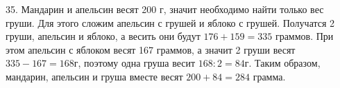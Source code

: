 35. Мандарин и апельсин весят 200 г, значит необходимо найти только вес груши. Для этого сложим апельсин с грушей и яблоко с грушей. Получатся 2 груши, апельсин и яблоко, а весить они будут $176+159=335$ граммов. При этом апельсин с яблоком весят 167 граммов, а значит 2 груши весят $335-167=168$г, поэтому одна груша весит $168:2=84$г. Таким образом, мандарин, апельсин и груша вместе весят $200+84=284$ грамма.\\
